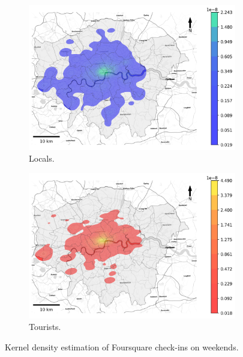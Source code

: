 \documentclass{article}
\theoremstyle{remark}
\begin{document}
\begin{figure}[!h]

\begin{subfigure}{0.5\textwidth}
\includegraphics[width=1\linewidth]{figures/kde_locals_weekend.png} 
\caption{Locals.}
\label{fig:kde_locals_weekend}
\end{subfigure}
\begin{subfigure}{0.5\textwidth}
\includegraphics[width=1\linewidth]{figures/kde_tourists_weekend.png}
\caption{Tourists.}
\label{fig:kde_tourists_weekend}
\end{subfigure}

\caption{Kernel density estimation of Foursquare check-ins on weekends.} \label{fig:kde_weekend}
\end{figure}


\end{document}

